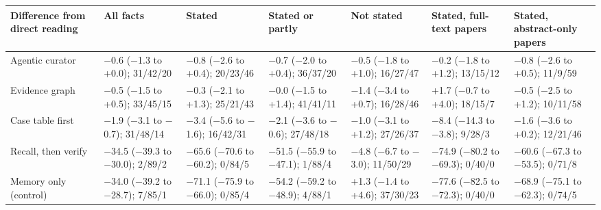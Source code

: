 \documentclass{article} %
\begin{document}
\begin{table}[!htbp]
\tiny
\begin{tabularx}{\linewidth}{>{\raggedright\arraybackslash}p{2.0cm}>{\centering\arraybackslash}X>{\centering\arraybackslash}X>{\centering\arraybackslash}X>{\centering\arraybackslash}X>{\centering\arraybackslash}X>{\centering\arraybackslash}X}
\toprule
Difference from direct reading & All facts & Stated & Stated or partly & Not stated & Stated, full-text papers & Stated, abstract-only papers \\
\midrule
Agentic curator & $-$0.6 ($-$1.3 to +0.0); 31/42/20 & $-$0.8 ($-$2.6 to +0.4); 20/23/46 & $-$0.7 ($-$2.0 to +0.4); 36/37/20 & $-$0.5 ($-$1.8 to +1.0); 16/27/47 & $-$0.2 ($-$1.8 to +1.2); 13/15/12 & $-$0.8 ($-$2.6 to +0.5); 11/9/59 \\
Evidence graph & $-$0.5 ($-$1.5 to +0.5); 33/45/15 & $-$0.3 ($-$2.1 to +1.3); 25/21/43 & $-$0.0 ($-$1.5 to +1.4); 41/41/11 & $-$1.4 ($-$3.4 to +0.7); 16/28/46 & +1.7 ($-$0.7 to +4.0); 18/15/7 & $-$0.5 ($-$2.5 to +1.2); 10/11/58 \\
Case table first & $-$1.9 ($-$3.1 to $-$0.7); 31/48/14 & $-$3.4 ($-$5.6 to $-$1.6); 16/42/31 & $-$2.1 ($-$3.6 to $-$0.6); 27/48/18 & $-$1.0 ($-$3.1 to +1.2); 27/26/37 & $-$8.4 ($-$14.3 to $-$3.8); 9/28/3 & $-$1.6 ($-$3.6 to +0.2); 12/21/46 \\
Recall, then verify & $-$34.5 ($-$39.3 to $-$30.0); 2/89/2 & $-$65.6 ($-$70.6 to $-$60.2); 0/84/5 & $-$51.5 ($-$55.9 to $-$47.1); 1/88/4 & $-$4.8 ($-$6.7 to $-$3.0); 11/50/29 & $-$74.9 ($-$80.2 to $-$69.3); 0/40/0 & $-$60.6 ($-$67.3 to $-$53.5); 0/71/8 \\
Memory only (control) & $-$34.0 ($-$39.2 to $-$28.7); 7/85/1 & $-$71.1 ($-$75.9 to $-$66.0); 0/85/4 & $-$54.2 ($-$59.2 to $-$48.9); 4/88/1 & +1.3 ($-$1.4 to +4.6); 37/30/23 & $-$77.6 ($-$82.5 to $-$72.3); 0/40/0 & $-$68.9 ($-$75.1 to $-$62.3); 0/74/5 \\
\bottomrule
\end{tabularx}
\end{table}

\FloatBarrier
\end{document}
